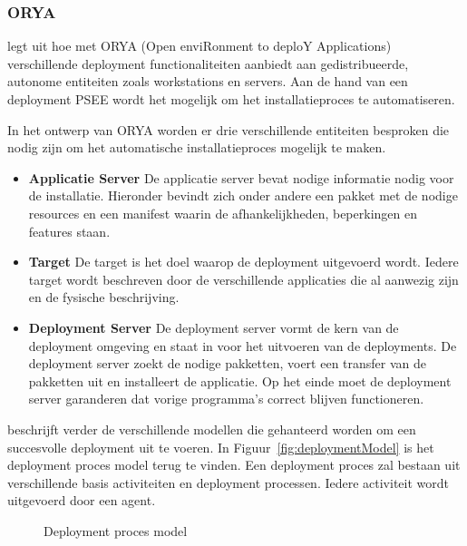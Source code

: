 \subsubsection{ORYA}\label{sec:ORYA}
\citet{lestideau2003providing} legt uit hoe met ORYA (Open enviRonment to deploY Applications) verschillende deployment functionaliteiten aanbiedt aan gedistribueerde, autonome entiteiten zoals workstations en servers.
Aan de hand van een deployment PSEE \citep{belkhatir2007adele} wordt het mogelijk om het installatieproces te automatiseren.

In het ontwerp van ORYA worden er drie verschillende entiteiten besproken die nodig zijn om het automatische installatieproces mogelijk te maken.
\begin{itemize}
\item \textbf{Applicatie Server} De applicatie server bevat nodige informatie nodig voor de installatie.
Hieronder bevindt zich onder andere een pakket met de nodige resources en een manifest waarin de afhankelijkheden, beperkingen en features staan.
\item \textbf{Target} De target is het doel waarop de deployment uitgevoerd wordt.
Iedere target wordt beschreven door de verschillende applicaties die al aanwezig zijn en de fysische beschrijving.
\item \textbf{Deployment Server} De deployment server vormt de kern van de deployment omgeving en staat in voor het uitvoeren van de deployments. 
De deployment server zoekt de nodige pakketten, voert een transfer van de pakketten uit en installeert de applicatie.
Op het einde moet de deployment server garanderen dat vorige programma's correct blijven functioneren.
\end{itemize}

\citet{lestideau2003providing} beschrijft verder de verschillende modellen die gehanteerd worden om een succesvolle deployment uit te voeren.
In Figuur~\vref{fig:deploymentModel} is het deployment proces model terug te vinden.
Een deployment proces zal bestaan uit verschillende basis activiteiten en deployment processen.
Iedere activiteit wordt uitgevoerd door een agent.

\begin{figure}[!ht]
\centering
{}
\caption{Deployment proces model \citep{lestideau2003providing}}
\label{fig:deploymentModel}
\end{figure}

